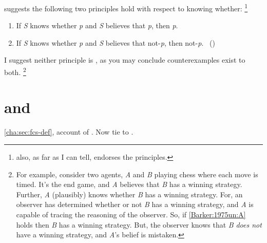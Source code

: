 \begin{note}
  \begin{illustration}
    \citeauthor{Barker:1975un} suggests the following two principles hold with respect to knowing whether:%
  \footnote{
    \citeauthor{Barker:1975un} also, as far as I can tell, endorses the principles.
  }
    \begin{enumerate}[label=(\Alph*), ref=(\Alph*), noitemsep]
    \item
      \label{Barker:1975un:A}
      If \emph{S} knows whether \emph{p} and \emph{S} believes that \emph{p}, then \emph{p}.
    \item
      \label{Barker:1975un:B}
      If \emph{S} knows whether \emph{p} and \emph{S} believes that not-\emph{p}, then not-\emph{p}.%
      \mbox{ }\hfill\mbox{(\citeyear[281]{Barker:1975un})}
    \end{enumerate}
  \end{illustration}
  I suggest neither principle is \fc{}, as you may conclude counterexamples exist to both.%
  \footnote{
    For example, consider two agents, \emph{A} and \emph{B} playing chess where each move is timed.
  It's the end game, and \emph{A} believes that \emph{B} has a winning strategy.
  Further, \emph{A} (plausibly) knows whether \emph{B} has a winning strategy.
  For, an observer has determined whether or not \emph{B} has a winning strategy, and \emph{A} is capable of tracing the reasoning of the observer.
  So, if \ref{Barker:1975un:A} holds then \emph{B} has a winning strategy.
  But, the observer knows that \emph{B} \emph{does not} have a winning strategy, and \emph{A}'s belief is mistaken.
  }
\end{note}

\section{ and }
\label{cha:fcs:sec:fcs-support}

\begin{note}
  \autoref{cha:sec:fcs-def}, account of .
  Now tie to .
\end{note}


